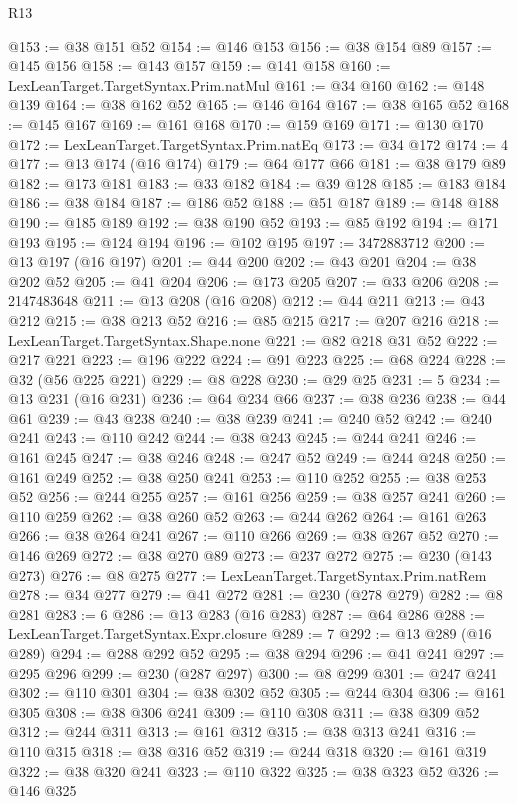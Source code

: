 \begin{lexlean}{R13}
\begin{coremodule}
@153 := @38 @151 @52
@154 := @146 @153
@156 := @38 @154 @89
@157 := @145 @156
@158 := @143 @157
@159 := @141 @158
@160 := LexLeanTarget.TargetSyntax.Prim.natMul
@161 := @34 @160
@162 := @148 @139
@164 := @38 @162 @52
@165 := @146 @164
@167 := @38 @165 @52
@168 := @145 @167
@169 := @161 @168
@170 := @159 @169
@171 := @130 @170
@172 := LexLeanTarget.TargetSyntax.Prim.natEq
@173 := @34 @172
@174 := 4
@177 := @13 @174 (@16 @174)
@179 := @64 @177 @66
@181 := @38 @179 @89
@182 := @173 @181
@183 := @33 @182
@184 := @39 @128
@185 := @183 @184
@186 := @38 @184
@187 := @186 @52
@188 := @51 @187
@189 := @148 @188
@190 := @185 @189
@192 := @38 @190 @52
@193 := @85 @192
@194 := @171 @193
@195 := @124 @194
@196 := @102 @195
@197 := 3472883712
@200 := @13 @197 (@16 @197)
@201 := @44 @200
@202 := @43 @201
@204 := @38 @202 @52
@205 := @41 @204
@206 := @173 @205
@207 := @33 @206
@208 := 2147483648
@211 := @13 @208 (@16 @208)
@212 := @44 @211
@213 := @43 @212
@215 := @38 @213 @52
@216 := @85 @215
@217 := @207 @216
@218 := LexLeanTarget.TargetSyntax.Shape.none
@221 := @82 @218 @31 @52
@222 := @217 @221
@223 := @196 @222
@224 := @91 @223
@225 := @68 @224
@228 := @32 (@56 @225 @221)
@229 := @8 @228
@230 := @29 @25
@231 := 5
@234 := @13 @231 (@16 @231)
@236 := @64 @234 @66
@237 := @38 @236
@238 := @44 @61
@239 := @43 @238
@240 := @38 @239
@241 := @240 @52
@242 := @240 @241
@243 := @110 @242
@244 := @38 @243
@245 := @244 @241
@246 := @161 @245
@247 := @38 @246
@248 := @247 @52
@249 := @244 @248
@250 := @161 @249
@252 := @38 @250 @241
@253 := @110 @252
@255 := @38 @253 @52
@256 := @244 @255
@257 := @161 @256
@259 := @38 @257 @241
@260 := @110 @259
@262 := @38 @260 @52
@263 := @244 @262
@264 := @161 @263
@266 := @38 @264 @241
@267 := @110 @266
@269 := @38 @267 @52
@270 := @146 @269
@272 := @38 @270 @89
@273 := @237 @272
@275 := @230 (@143 @273)
@276 := @8 @275
@277 := LexLeanTarget.TargetSyntax.Prim.natRem
@278 := @34 @277
@279 := @41 @272
@281 := @230 (@278 @279)
@282 := @8 @281
@283 := 6
@286 := @13 @283 (@16 @283)
@287 := @64 @286
@288 := LexLeanTarget.TargetSyntax.Expr.closure
@289 := 7
@292 := @13 @289 (@16 @289)
@294 := @288 @292 @52
@295 := @38 @294
@296 := @41 @241
@297 := @295 @296
@299 := @230 (@287 @297)
@300 := @8 @299
@301 := @247 @241
@302 := @110 @301
@304 := @38 @302 @52
@305 := @244 @304
@306 := @161 @305
@308 := @38 @306 @241
@309 := @110 @308
@311 := @38 @309 @52
@312 := @244 @311
@313 := @161 @312
@315 := @38 @313 @241
@316 := @110 @315
@318 := @38 @316 @52
@319 := @244 @318
@320 := @161 @319
@322 := @38 @320 @241
@323 := @110 @322
@325 := @38 @323 @52
@326 := @146 @325

\end{coremodule}
\end{lexlean}
